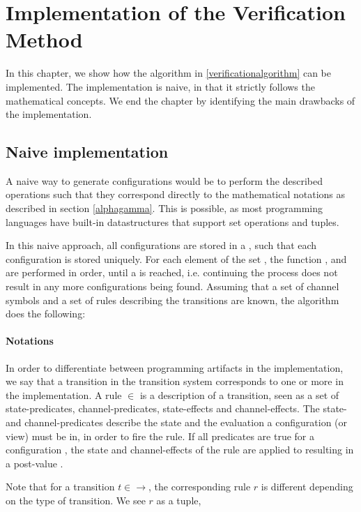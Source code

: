 \section{Implementation of the Verification Method}
\label{naive}
In this chapter, we show how the algorithm in \ref{verificationalgorithm} can be implemented. The implementation is naive, in that it strictly follows the mathematical concepts. We end the chapter by identifying the main drawbacks of the implementation.

\subsection{Naive implementation}
A naive way to generate configurations would be to perform the described operations such that they correspond directly to the mathematical notations as described in section \ref{alphagamma}. This is possible, as most programming languages have built-in datastructures that support set operations and tuples.

In this naive approach, all configurations are stored in a , such that each configuration is stored uniquely. For each element  of the set , the function ,  and  are performed in order, until a  is reached, i.e. continuing the process does not result in any more configurations being found. Assuming that a set of channel symbols and a set of rules  describing the transitions are known, the algorithm does the following:

\paragraph{Notations}
In order to differentiate between programming artifacts in the implementation, we say that a transition in the transition system corresponds to one or more  in the implementation. A rule  $\in$  is a description of a transition, seen as a set of state-predicates, channel-predicates, state-effects and channel-effects. The state- and channel-predicates describe the state and the evaluation a configuration (or view) must be in, in order to fire the rule. If all predicates are true for a configuration , the state and channel-effects of the rule are applied to  resulting in a post-value .

Note that for a transition $t \in \rightarrow$, the corresponding rule $r$ is different depending on the type of transition. We see $r$ as a tuple, 

